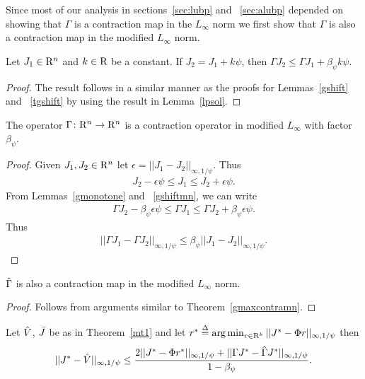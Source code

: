 \documentclass[12pt,draftcls,onecolumn]{IEEEtran}
\begin{document}
Since most of our analysis in sections~\ref{sec:lubp} and ~\ref{sec:alubp} depended on showing that $\Gamma$ is a contraction map in the $L_\infty$ norm we first show that $\Gamma$ is also a contraction map in the modified $L_\infty$ norm.
\begin{lemma}\label{gshiftmn}
Let $J_1\in \mathrm{R}^n$ and $k\in \mathrm{R}$ be a constant. If $J_2=J_1+k\psi$, then $\Gamma J_2\leq \Gamma J_1+\beta_{\psi} k\psi$.
\end{lemma}
\begin{proof}
The result follows in a similar manner as the proofs for Lemmas~\ref{gshift} and ~\ref{tgshift} by using the result in Lemma~\ref{lpsol}.
\end{proof}
\begin{theorem}\label{gmaxcontramn}
The operator $\Gamma  \colon \mathrm{R}^n\rightarrow \mathrm{R}^n$ is a contraction operator in modified $L_\infty$ with factor $\beta_{\psi}$.
\end{theorem}
\begin{proof}
Given $J_1,J_2\in \mathrm{R}^n$ let $\epsilon=||J_1-J_2||_{\infty,1/\psi}$. Thus
\begin{align}\label{ineq}
J_2-\epsilon\psi\leq J_1\leq J_2+\epsilon \psi.
\end{align}
From Lemmas~\ref{gmonotone} and ~\ref{gshiftmn}, we can write
\begin{align}\label{ineq}
\Gamma J_2-\beta_{\psi} \epsilon\psi\leq \Gamma J_1\leq \Gamma J_2+\beta_{\psi} \epsilon\psi.
\end{align}
Thus
\begin{align}
||\Gamma J_1-\Gamma J_2||_{\infty,1/\psi}\leq \beta_{\psi} ||J_1-J_2||_{\infty,1/\psi}.
\end{align}
\end{proof}
\begin{corollary}\label{hgmaxcontramn}
$\hat{\Gamma}$ is also a contraction map in the modified $L_\infty$ norm.
\end{corollary}
\begin{proof}
Follows from arguments similar to Theorem~\ref{gmaxcontramn}.
\end{proof}
\begin{lemma}\label{cmt1mn}
Let $\hat{V}$, $\bar{J}$ be as in Theorem~\ref{mt1} and let $r^*\stackrel{\Delta}{=}\arg\min_{r\in \mathrm{R}^k}||J^*-\Phi r||_{\infty,1/\psi}$ then
\begin{align}
||J^*-\hat{V}||_{\infty,1/\psi}\leq \frac{2||J^*-\Phi r^*||_{\infty,1/\psi}+||\Gamma J^*-\hat{\Gamma} J^*||_{\infty,1/\psi}}{1-\beta_{\psi}}.
\end{align}
\end{lemma}
\end{document}

